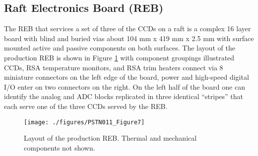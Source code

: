\subsection{Raft Electronics Board (REB)}
The REB that services a set of three of the CCDs on a raft is a complex 16 layer board with blind and buried vias about 104 mm x 419 mm x 2.5 mm with surface mounted active and passive components on both surfaces. The layout of the production REB is shown in Figure \ref{fig:Fig7} with component groupings illustrated CCDs, RSA temperature monitors, and  RSA trim heaters connect via 8 miniature connectors on the left edge of the board, power and high-speed digital I/O enter on two connectors on the right. On the left half of the board one can identify the analog and ADC blocks replicated in three identical “stripes” that each serve one of the three CCDs served by the REB.
 
\begin{figure}[htbp]
\begin{center}
\texttt{[image: ./figures/PSTN011\_Figure7]}
\caption{Layout of the production REB. Thermal and mechanical components not shown.}
\label{fig:Fig7}
\end{center}
\end{figure}
 
